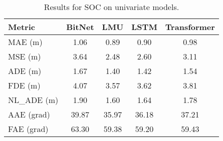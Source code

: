 \begin{table}[H]
\centering
\caption{Results for SOC on univariate models.}
\label{uni:SOC}
\begin{tabular}{l||c|c|c|c}
Metric & BitNet & LMU & LSTM & Transformer \\
\hline\hline
MAE (m) & 1.06 & 0.89 & 0.90 & 0.98 \\
MSE (m) & 3.64 & 2.48 & 2.60 & 3.11 \\
ADE (m) & 1.67 & 1.40 & 1.42 & 1.54 \\
FDE (m) & 4.07 & 3.57 & 3.62 & 3.81 \\
NL\_ADE (m) & 1.90 & 1.60 & 1.64 & 1.78 \\
AAE (grad) & 39.87 & 35.97 & 36.18 & 37.21 \\
FAE (grad) & 63.30 & 59.38 & 59.20 & 59.43 \\
\end{tabular}
\end{table}

